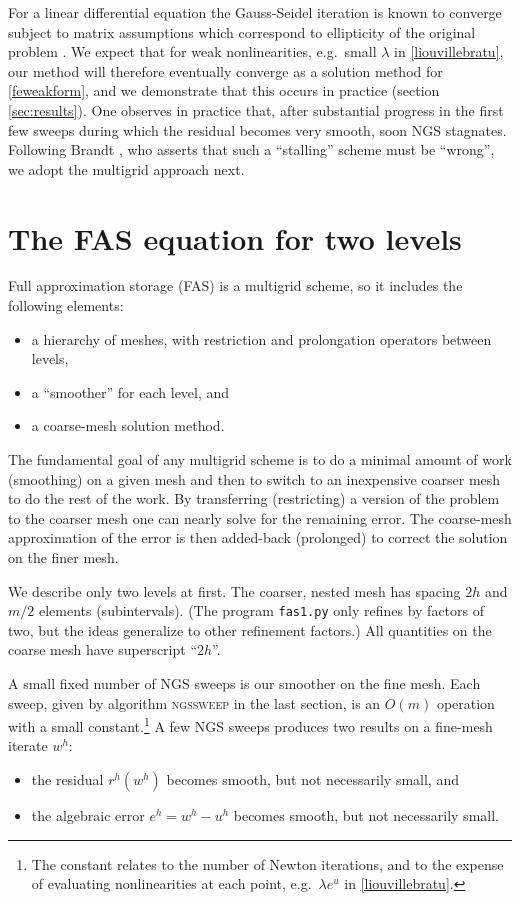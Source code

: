 \documentclass[letterpaper,final,12pt,reqno]{amsart}
\begin{document}
For a linear differential equation the Gauss-Seidel iteration is known to converge subject to matrix assumptions which correspond to ellipticity of the original problem \cite[for example]{Greenbaum1997}.  We expect that for weak nonlinearities, e.g.~small $\lambda$ in \eqref{liouvillebratu}, our method will therefore eventually converge as a solution method for \eqref{feweakform}, and we demonstrate that this occurs in practice (section \ref{sec:results}).  One observes in practice that, after substantial progress in the first few sweeps during which the residual becomes very smooth, soon NGS stagnates.  Following Brandt \cite{Brandt1977,BrandtLivne2011}, who asserts that such a ``stalling'' scheme must be ``wrong'', we adopt the multigrid approach next.


\section{The FAS equation for two levels}  \label{sec:fastwolevel}

Full approximation storage (FAS) \cite{Brandt1977,Briggsetal2000} is a multigrid scheme, so it includes the following elements:
\begin{itemize}
\item a hierarchy of meshes, with restriction and prolongation operators between levels,
\item a ``smoother'' for each level, and
\item a coarse-mesh solution method.
\end{itemize}
The fundamental goal of any multigrid scheme is to do a minimal amount of work (smoothing) on a given mesh and then to switch to an inexpensive coarser mesh to do the rest of the work.  By transferring (restricting) a version of the problem to the coarser mesh one can nearly solve for the remaining error.  The coarse-mesh approximation of the error is then added-back (prolonged) to correct the solution on the finer mesh.

We describe only two levels at first.  The coarser, nested mesh has spacing $2h$ and $m/2$ elements (subintervals).  (The program \texttt{fas1.py} only refines by factors of two, but the ideas generalize to other refinement factors.)  All quantities on the coarse mesh have superscript ``$2h$''.

A small fixed number of NGS sweeps is our smoother on the fine mesh.  Each sweep, given by algorithm \textsc{ngssweep} in the last section, is an $O(m)$ operation with a small constant.\footnote{The constant relates to the number of Newton iterations, and to the expense of evaluating nonlinearities at each point, e.g.~$\lambda e^u$ in \eqref{liouvillebratu}.}  A few NGS sweeps produces two results on a fine-mesh iterate $w^h$:
\begin{itemize}
\item the residual $r^h(w^h)$ becomes smooth, but not necessarily small, and
\item the algebraic error $e^h = w^h - u^h$ becomes smooth, but not necessarily small.
\end{itemize}
\end{document}
